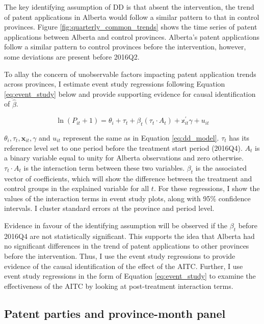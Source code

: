 \documentclass[../main.tex]{subfiles}
\begin{document}
The key identifying assumption of DD is that absent the intervention, the trend of patent applications in Alberta would follow a similar pattern to that in control provinces. Figure \ref{fig:quarterly_common_trends} shows the time series of patent applications between Alberta and control provinces. Alberta's patent applications follow a similar pattern to control provinces before the intervention, however, some deviations are present before 2016Q2.

To allay the concern of unobservable factors impacting patent application trends across provinces, I estimate event study regressions following Equation \ref{eq:event_study} below and provide supporting evidence for causal identification of $\hat{\beta}$.

\begin{equation}
    \label{eq:event_study}
   \ln(P_{it} + 1) = \theta_i + \tau_t + \beta_t (\tau_t \cdot A_t) + \mathbb{x}_{it}^{'}\gamma + u_{it}
\end{equation}

$\theta_i, \tau_t, \mathbf{x}_{it}, \gamma$ and $u_{it}$ represent the same as in Equation \ref{eq:dd_model}. $\tau_t$ has its reference level set to one period before the treatment start period (2016Q4). $A_t$ is a binary variable equal to unity for Alberta observations and zero otherwise. $\tau_t \cdot A_t$ is the interaction term between these two variables. $\beta_t$ is the associated vector of coefficients, which will show the difference between the treatment and control groups in the explained variable for all $t$. For these regressions, I show the values of the interaction terms in event study plots, along with 95\% confidence intervals. I cluster standard errors at the province and period level.

Evidence in favour of the identifying assumption will be observed if the $\beta_t$ before 2016Q4 are not statistically significant. This supports the idea that Alberta had no significant differences in the trend of patent applications to other provinces before the intervention. Thus, I use the event study regressions to provide evidence of the causal identification of the effect of the AITC. Further, I use event study regressions in the form of Equation \ref{eq:event_study} to examine the effectiveness of the AITC by looking at post-treatment interaction terms.

\subsection{Patent parties and province-month panel}
\end{document}
